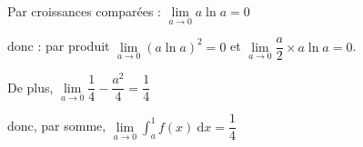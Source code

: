 \begin{enumerate}
\begin{enumerate}
Par croissances comparées : $\lim\limits_{a \to 0} a \ln a = 0$ 

donc : par produit $\lim\limits_{a \to 0} \left(a \ln a \right)^2= 0$ et $\lim\limits_{a \to 0} \dfrac{a}{2} \times a\ln a=0$.

De plus, $\lim\limits_{a \to 0}  \dfrac{1}{4} - \dfrac{a^2}{4}=\dfrac{1}{4}$ 

donc, par somme, $\lim\limits_{a \to 0 }	\displaystyle\int_a^1 f(x)\: \text{d}x  = \dfrac{1}{4}$

	\end{enumerate}
\end{enumerate}
